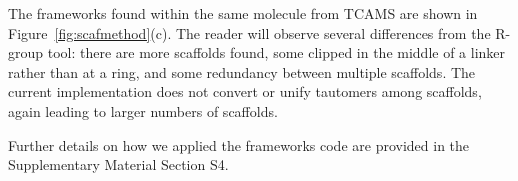 \documentclass[journal=jacsat,biochem,manuscript=article]{achemso}
\newcommand*\fref[1]{Figure~\ref{fig:#1}}
\begin{document}


The frameworks found within the same molecule from TCAMS are shown
in \fref{scafmethod}(c).  The reader will observe several differences
from the R-group tool: there are more scaffolds found, some clipped in
the middle of a linker rather than at a ring, and some redundancy
between multiple scaffolds. The current implementation does not
convert or unify tautomers among scaffolds, again leading to larger
numbers of scaffolds. %

Further details on how we applied 
the frameworks code are provided in the Supplementary Material Section S4. 

%
%
\end{document}
